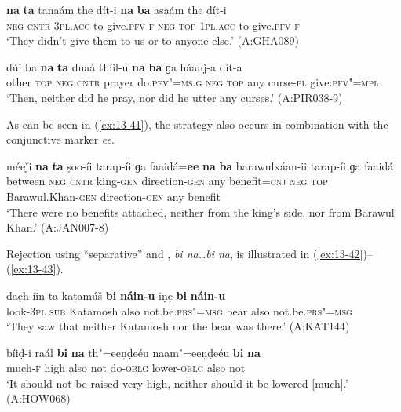 \begin{exe}
\ex
\label{ex:13-39}
\gll \textbf{na} \textbf{ta} tanaám the dít-i \textbf{na} \textbf{ba} asaám the dít-i \\
\textsc{neg} \textsc{cntr} \textsc{3pl.acc} to give.\textsc{pfv-f} \textsc{neg} \textsc{top} \textsc{1pl.acc} to give.\textsc{pfv-f}  \\
\glt `They didn't give them to us or to anyone else.' (A:GHA089)

\ex
\label{ex:13-40}
\gll dúi ba {\ob}\textbf{na} \textbf{ta} duaá thíil-u \textbf{na} \textbf{ba} ɡa háanǰ-a dít-a{\cb}\\
other \textsc{top} \textsc{neg} \textsc{cntr} prayer do.\textsc{pfv"=ms.g} \textsc{neg} \textsc{top} any curse-\textsc{pl} give.\textsc{pfv"=mpl}\\
\glt `Then, neither did he pray, nor did he utter any curses.' (A:PIR038-9) 
\end{exe}

As can be seen in (\ref{ex:13-41}), the strategy also occurs in combination with the conjunctive marker \textit{ee}.

\begin{exe}
\ex
\label{ex:13-41}
\gll méeǰi {\ob}\textbf{na} \textbf{ta} ṣoo-íi tarap-íi ɡa faaidá=\textbf{ee} \textbf{na} \textbf{ba} barawulxáan-ii tarap-íi ɡa faaidá{\cb}\\
between \textsc{neg} \textsc{cntr} king-\textsc{gen} direction-\textsc{gen} any benefit=\textsc{cnj} \textsc{neg} \textsc{top} Barawul.Khan-\textsc{gen} direction-\textsc{gen} any benefit  \\
\glt `There were no benefits attached, neither from the king's side, nor from Barawul Khan.' (A:JAN007-8) 
\end{exe}

Rejection using ``separative''  and , \textit{bi na{\ldots}bi na}, is illustrated in (\ref{ex:13-42})--(\ref{ex:13-43}).

\begin{exe}
\ex
\label{ex:13-42}
\gll dac̣h-íin ta {\ob}kaṭamúš \textbf{bi} \textbf{náin-u} iṇc̣ \textbf{bi} \textbf{náin-u}{\cb}\\
look-\textsc{3pl} \textsc{sub} Katamosh also not.be.\textsc{prs"=msg} bear also not.be.\textsc{prs"=msg} \\
\glt `They saw that neither Katamosh nor the bear was there.' (A:KAT144)

\ex
\label{ex:13-43}
\gll bíiḍ-i raál \textbf{bi} \textbf{na} th"=eeṇḍeéu naam"=eeṇḍeéu \textbf{bi} \textbf{na} \\
much-\textsc{f} high also not do-\textsc{oblg} lower-\textsc{oblg} also not  \\
\glt `It should not be raised very high, neither should it be lowered [much].' (A:HOW068) 
\end{exe}

